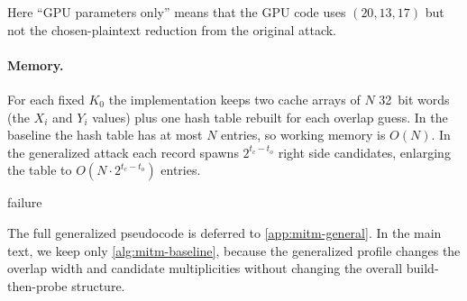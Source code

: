 \documentclass[version=preprint]{iacrcc}
\begin{document}
Here ``GPU parameters only'' means that the GPU code uses $(20,13,17)$ but not the chosen-plaintext reduction from the original attack.

\paragraph{Memory.}
For each fixed $K_0$ the implementation keeps two cache arrays of $N$ 32~bit words (the $X_i$ and $Y_i$ values) plus one hash table rebuilt for each overlap guess.
In the baseline the hash table has at most $N$ entries, so working memory is $O(N)$.
In the generalized attack each record spawns $2^{t_c - t_o}$ right side candidates, enlarging the table to $O(N \cdot 2^{t_c - t_o})$ entries.

\begin{algorithm}[htbp]
\caption{Baseline S/MITM attack (profile $16,16,16$)}\label{alg:mitm-baseline}
\SetAlgoLined
{}
\Return failure\;
\end{algorithm}

The full generalized pseudocode is deferred to \autoref{app:mitm-general}.
In the main text, we keep only \autoref{alg:mitm-baseline}, because the generalized profile changes the overlap width and candidate multiplicities without changing the overall build-then-probe structure.
\end{document}
